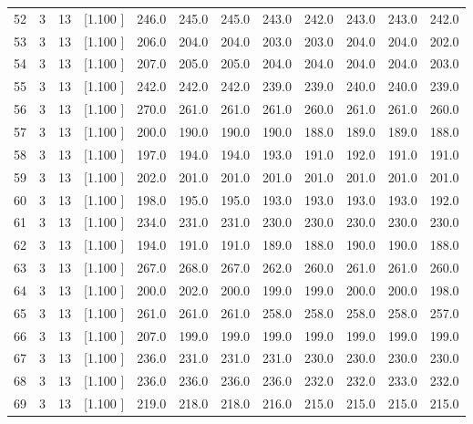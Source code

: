 \documentclass[12pt,a4paper]{article}
\begin{document}
\begin{center}
{\begin{tabular}{r r r r r r r r r r r r}
  52&  3& 13&[1.100     ]&   246.0&   245.0&   245.0&   243.0&   242.0&   243.0&   243.0&   242.0\\[-0.02in]
  53&  3& 13&[1.100     ]&   206.0&   204.0&   204.0&   203.0&   203.0&   204.0&   204.0&   202.0\\[-0.02in]
  54&  3& 13&[1.100     ]&   207.0&   205.0&   205.0&   204.0&   204.0&   204.0&   204.0&   203.0\\[-0.02in]
  55&  3& 13&[1.100     ]&   242.0&   242.0&   242.0&   239.0&   239.0&   240.0&   240.0&   239.0\\[-0.02in]
  56&  3& 13&[1.100     ]&   270.0&   261.0&   261.0&   261.0&   260.0&   261.0&   261.0&   260.0\\[-0.02in]
  57&  3& 13&[1.100     ]&   200.0&   190.0&   190.0&   190.0&   188.0&   189.0&   189.0&   188.0\\[-0.02in]
  58&  3& 13&[1.100     ]&   197.0&   194.0&   194.0&   193.0&   191.0&   192.0&   191.0&   191.0\\[-0.02in]
  59&  3& 13&[1.100     ]&   202.0&   201.0&   201.0&   201.0&   201.0&   201.0&   201.0&   201.0\\[-0.02in]
  60&  3& 13&[1.100     ]&   198.0&   195.0&   195.0&   193.0&   193.0&   193.0&   193.0&   192.0\\[-0.02in]
  61&  3& 13&[1.100     ]&   234.0&   231.0&   231.0&   230.0&   230.0&   230.0&   230.0&   230.0\\[-0.02in]
  62&  3& 13&[1.100     ]&   194.0&   191.0&   191.0&   189.0&   188.0&   190.0&   190.0&   188.0\\[-0.02in]
  63&  3& 13&[1.100     ]&   267.0&   268.0&   267.0&   262.0&   260.0&   261.0&   261.0&   260.0\\[-0.02in]
  64&  3& 13&[1.100     ]&   200.0&   202.0&   200.0&   199.0&   199.0&   200.0&   200.0&   198.0\\[-0.02in]
  65&  3& 13&[1.100     ]&   261.0&   261.0&   261.0&   258.0&   258.0&   258.0&   258.0&   257.0\\[-0.02in]
  66&  3& 13&[1.100     ]&   207.0&   199.0&   199.0&   199.0&   199.0&   199.0&   199.0&   199.0\\[-0.02in]
  67&  3& 13&[1.100     ]&   236.0&   231.0&   231.0&   231.0&   230.0&   230.0&   230.0&   230.0\\[-0.02in]
  68&  3& 13&[1.100     ]&   236.0&   236.0&   236.0&   236.0&   232.0&   232.0&   233.0&   232.0\\[-0.02in]
  69&  3& 13&[1.100     ]&   219.0&   218.0&   218.0&   216.0&   215.0&   215.0&   215.0&   215.0\\[-0.02in]

\end{tabular}}
\end{center}
\end{document}
